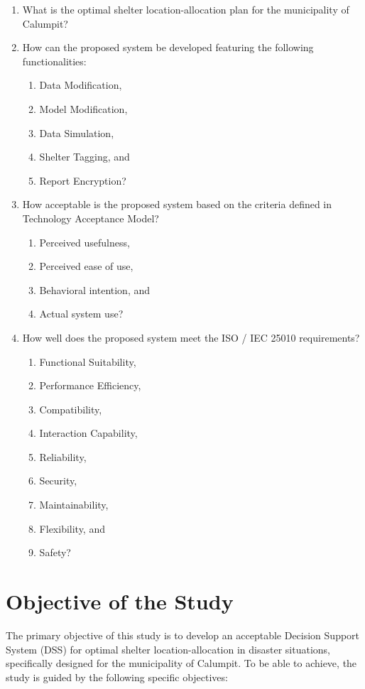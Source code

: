 	\begin{enumerate}
		\item What is the optimal shelter location-allocation plan for the municipality of Calumpit?
		\item How can the proposed system be developed featuring the following functionalities:
		\begin{enumerate}
			\item Data Modification,
			\item Model Modification,
			\item Data Simulation,
			\item Shelter Tagging, and
			\item Report Encryption?
		\end{enumerate}
		\item How acceptable is the proposed system based on the criteria defined in Technology Acceptance Model?
		\begin{enumerate}
			\item Perceived usefulness,
			\item Perceived ease of use,
			\item Behavioral intention, and
			\item Actual system use?
		\end{enumerate}
		\item How well does the proposed system meet the ISO / IEC 25010 requirements?
		\begin{enumerate}
			\item Functional Suitability,
			\item Performance Efficiency,
			\item Compatibility,
			\item Interaction Capability,
			\item Reliability,
			\item Security,
			\item Maintainability,
			\item Flexibility, and
			\item Safety?
		\end{enumerate}
	\end{enumerate}
	
\section{Objective of the Study}
	The primary objective of this study is to develop an acceptable Decision Support System (DSS) for optimal shelter location-allocation in disaster situations, specifically designed for the municipality of Calumpit. To be able to achieve, the study is guided by the following specific objectives:
	
